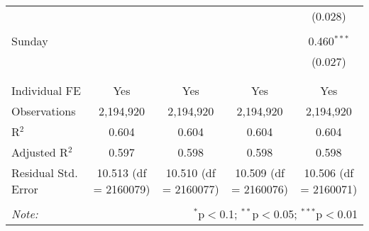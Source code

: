 \documentclass[
]{article}
\begin{document}
\begin{table}[!htbp]
{\begin{tabular}{@{\extracolsep{5pt}}lcccc}
  &  &  &  & (0.028) \\ 
  & & & & \\ 
 Sunday &  &  &  & 0.460$^{***}$ \\ 
  &  &  &  & (0.027) \\ 
  & & & & \\ 
\hline \\[-1.8ex] 
Individual FE & Yes & Yes & Yes & Yes \\ 
Observations & 2,194,920 & 2,194,920 & 2,194,920 & 2,194,920 \\ 
R$^{2}$ & 0.604 & 0.604 & 0.604 & 0.604 \\ 
Adjusted R$^{2}$ & 0.597 & 0.598 & 0.598 & 0.598 \\ 
Residual Std. Error & 10.513 (df = 2160079) & 10.510 (df = 2160077) & 10.509 (df = 2160076) & 10.506 (df = 2160071) \\ 
\hline 
\hline \\[-1.8ex] 
\textit{Note:}  & \multicolumn{4}{r}{$^{*}$p$<$0.1; $^{**}$p$<$0.05; $^{***}$p$<$0.01} \\ 
\end{tabular}
} 
\end{table} 
\newpage
\end{document}
